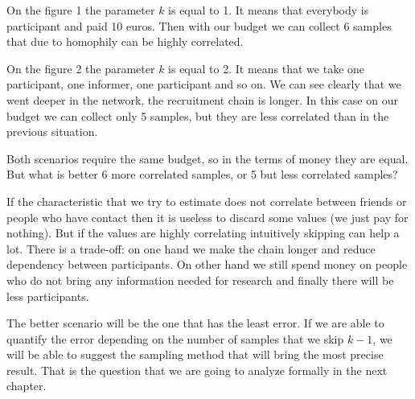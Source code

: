 \documentclass[12pt]{report}
\begin{document}
On the figure 1 the parameter $k$ is equal to 1. It means that everybody is participant and paid 10 euros. Then with our budget we can collect 6 samples that due to homophily can be highly correlated.

On the figure 2 the parameter $k$ is equal to 2. It means that we take one participant, one informer, one participant and so on. We can see clearly that we went deeper in the network, the recruitment chain is longer. In this case on our budget we can collect only 5 samples, but they are less correlated than in the previous situation. 

Both scenarios require the same budget, so in the terms of money they are equal. But what is better 6 more correlated samples, or 5 but less correlated samples? 

If the characteristic that we try to estimate does not correlate between friends or people who have contact then it is useless to discard some values (we just pay for nothing). But if the values are highly correlating intuitively skipping can help a lot. There is a trade-off: on one hand we make the chain longer and reduce dependency between participants. On other hand we still spend money on people who do not bring any information needed for research and finally there will be less participants. 


The better scenario will be the one that has the least error. If we are able to quantify the error depending on the number of samples that we skip $k-1$, we will be able to suggest the sampling method that will bring the most precise result. That is the question that we are going to analyze formally in the next chapter. 
 



\newpage
\end{document}
